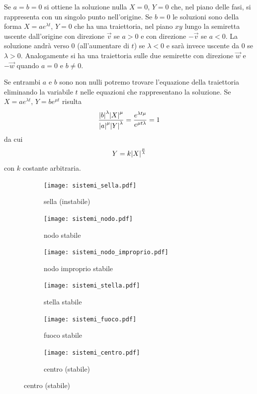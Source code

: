 Se $a=b=0$ si ottiene la soluzione nulla $X=0$, $Y=0$ che,
nel piano delle fasi, si rappresenta con un singolo punto
nell'origine. Se $b=0$ le soluzioni sono della forma
$X=a e^{\lambda t}$, $Y=0$ che ha una traiettoria,
nel piano $xy$ lungo la semiretta uscente dall'origine
con direzione $\vec v$
se $a>0$ e con direzione $-\vec v$ se $a<0$.
La soluzione andrà verso $0$ (all'aumentare di $t$)
se $\lambda<0$ e sarà invece uscente da $0$ se $\lambda >0$.
Analogamente si ha una traiettoria sulle due semirette
con direzione $\vec w$ e $-\vec w$ quando $a=0$ e $b\neq 0$.

Se entrambi $a$ e $b$ sono non nulli potremo trovare
l'equazione della traiettoria eliminando la variabile
$t$ nelle
equazioni che rappresentano la soluzione.
Se $X=a e^{\lambda t}$, $Y=b e^{\mu t}$ risulta
\[
  \frac{{\left|b\right|}^\lambda {\left|X\right|}^\mu}{{\left|a\right|}^\mu {\left|Y\right|}^\lambda}
  = \frac{e^{\lambda t \mu}}{e^{\mu t \lambda}} = 1
\]
da cui
\[
 Y = k {\left|X\right|}^{\frac \mu \lambda}
\]
con $k$ costante arbitraria.

\begin{figure}
\centering
 \begin{subfigure}{5cm}
  \centering\texttt{[image: sistemi\_sella.pdf]}
  \caption[1a]{sella (instabile)}
 \end{subfigure}
 \begin{subfigure}{5cm}
  \centering\texttt{[image: sistemi\_nodo.pdf]}
  \caption{nodo stabile}
 \end{subfigure}
 \begin{subfigure}{5cm}
 \centering\texttt{[image: sistemi\_nodo\_improprio.pdf]}
  \caption{nodo improprio stabile}
 \end{subfigure}
 \begin{subfigure}{5cm}
  \centering\texttt{[image: sistemi\_stella.pdf]}
  \caption{stella stabile}
 \end{subfigure}
 \begin{subfigure}{5cm}
  \centering\texttt{[image: sistemi\_fuoco.pdf]}
  \caption{fuoco stabile}
 \end{subfigure}
 \begin{subfigure}{5cm}
  \centering\texttt{[image: sistemi\_centro.pdf]}
  \caption{centro (stabile)}
 \end{subfigure}
\end{figure}

